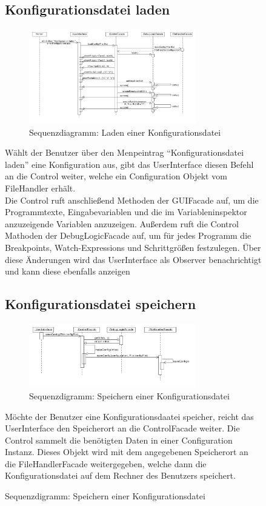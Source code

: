 ﻿\documentclass[parskip=full]{scrartcl}
\begin{document}
\begin{figure}[!h]
\subsection{Konfigurationsdatei laden}
\begin{figure}[!h]
\centering
\includegraphics[width=0.8\textwidth]{diagrammIdeenUmlet/SequenceDiagrams/seq_loadConfigPDF.pdf}
\caption{Sequenzdiagramm:  Laden einer Konfigurationsdatei}
\end{figure}
Wählt der Benutzer über den Menpeintrag \enquote{Konfigurationsdatei laden} eine Konfiguration aus,
gibt das UserInterface diesen Befehl an die Control weiter, welche ein Configuration Objekt vom FileHandler 
erhält. \\
Die Control ruft anschließend Methoden der GUIFacade auf, um die Programmtexte, Eingabevariablen und
die im Variableninspektor anzuzeigende Variablen anzuzeigen. Außerdem ruft die Control
Mathoden der DebugLogicFacade auf, um für jedes Programm die Breakpoints, Watch-Expressions und
Schrittgrößen festzulegen. Über diese Änderungen wird das UserInterface als Observer benachrichtigt und
kann diese ebenfalls anzeigen

\newpage
\subsection{Konfigurationsdatei speichern}
\begin{figure}[!h]
\centering
\includegraphics[width=0.8\textwidth]{diagrammIdeenUmlet/SequenceDiagrams/seq_saveConfigPDF.pdf}
\caption{Sequenzdigramm: Speichern einer Konfigurationsdatei}
\end{figure}
Möchte der Benutzer eine Konfigurationsdaatei speicher, reicht das UserInterface den Speicherort
an die ControlFacade weiter. Die Control sammelt die benötigten Daten in einer Configuration Instanz.
Dieses Objekt wird mit dem angegebenen Speicherort an die FileHandlerFacade weitergegeben, welche 
dann die Konfigurationsdatei auf dem Rechner des Benutzers speichert.


\end{figure}
\end{document}

